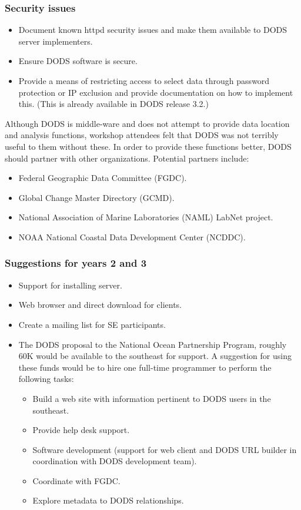\subsubsection{Security issues}

\begin{itemize}
\item Document known httpd security issues and make them available to DODS server 
implementers.
\item Ensure DODS software is secure.
\item Provide a means of restricting access to select data through
  password protection or IP exclusion and provide documentation on how
  to implement this. (This is already available in DODS release 3.2.)
\end{itemize}

Although DODS is middle-ware and does not attempt to provide data
location and analysis functions, workshop attendees felt that DODS was
not terribly useful to them without these.  In order to provide these
functions better, DODS should partner with other organizations.
Potential partners include:

\begin{itemize}
\item Federal Geographic Data Committee (FGDC).
\item Global Change Master Directory (GCMD).
\item National Association of Marine Laboratories (NAML) LabNet project.
\item NOAA National Coastal Data Development Center (NCDDC).
\end{itemize}

\subsubsection{Suggestions for years 2 and 3}


\begin{itemize}
\item Support for installing server.
\item Web browser and direct download for clients.
\item Create a mailing list for SE participants.        
\item The DODS proposal to the National Ocean Partnership Program,
  roughly 60K would be available to the southeast for support.  A
  suggestion for using these funds would be to hire one full-time
  programmer to perform the following tasks:
\begin{itemize}
\item Build a web site with information pertinent to DODS users in the
  southeast.
\item Provide help desk support.
\item Software development (support for web client and DODS URL builder in 
coordination with DODS development team).
\item Coordinate with FGDC.
\item Explore metadata to DODS relationships.
\end{itemize}
\end{itemize}



